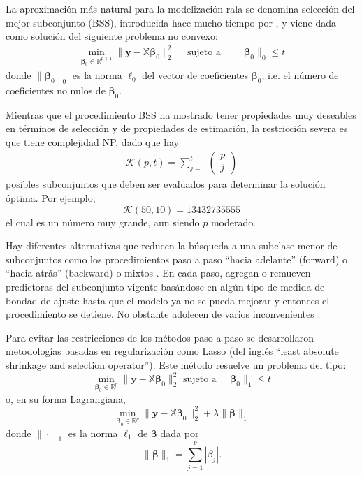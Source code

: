 \documentclass{report}
\begin{document}
 La aproximación más natural para la modelización rala se denomina selección del mejor subconjunto (BSS), introducida hace mucho tiempo por \cite{gar1965}, y viene dada como solución del siguiente problema no convexo: 
\begin{eqnarray}\label{eq:1.2}
	\min _{\boldsymbol{\beta}_0\in \mathbb{R}^{p+1}}\|\mathbf{y}-\mathbb{X} \boldsymbol{\beta}_0\|_2^2 \quad \text { sujeto  a } \quad\|\boldsymbol{\beta}_0\|_0 \leq t
\end{eqnarray}
donde $\|\boldsymbol{\beta}_0\|_0$ es la norma $\ell_0$ del vector de coeficientes $\boldsymbol{\beta}_0$; i.e. el número de coeficientes no nulos de $\boldsymbol{\beta}_0$. 



 Mientras que el procedimiento BSS ha mostrado tener propiedades muy deseables en términos de selección y de propiedades de estimación, la restricción severa es que tiene complejidad NP, dado que hay 
\begin{eqnarray} \label{eq:1.3}
	\mathcal{K}(p, t)=\sum_{j=0}^t\left(\begin{array}{l}
		p \\
		j
	\end{array}\right)
\end{eqnarray}
posibles subconjuntos que deben ser evaluados para determinar la solución óptima. Por ejemplo, $$\mathcal{K}(50,10)=13432735555$$  el cual es un número  muy grande, aun siendo $p$ moderado. 


 Hay diferentes alternativas que reducen la búsqueda a una subclase menor de subconjuntos  como los procedimientos paso a paso ``hacia adelante'' (forward) o ``hacia atrás'' (backward) o mixtos \citep[p.~79]{james2021}. En cada paso, agregan o remueven predictoras del subconjunto vigente basándose en algún tipo de medida de bondad de ajuste hasta que el modelo ya no se pueda mejorar y entonces el procedimiento se detiene. No obstante adolecen de varios inconvenientes \citep{christidisthesis}. 


 Para evitar las restricciones de los métodos paso a paso se desarrollaron metodo\-logías basadas en regularización como Lasso (del inglés ``least absolute shrinkage and selection operator''). Este método resuelve un problema del tipo:
$$
\min _{\boldsymbol{\beta}_0 \in \mathbb{R}^p}\|\mathbf{y}-\mathbb{X} \boldsymbol{\beta}_0\|_2^2 \text { sujeto a  }\|\boldsymbol{\beta}_0\|_1 \leq t
$$
o, en su forma Lagrangiana,
$$
\min _{\boldsymbol{\beta}_0 \in \mathbb{R}^p}\|\mathbf{y}-\mathbb{X} \boldsymbol{\beta}_0\|_2^2+\lambda\|\boldsymbol{\beta}\|_1
$$
donde $\|\cdot \|_1$ es la norma   $\ell_1$ de $\boldsymbol{\beta}$ dada por $$\|\boldsymbol{\beta}\|_1=\sum_{j=1}^p\left|\beta_j\right|.$$ 
\end{document}
